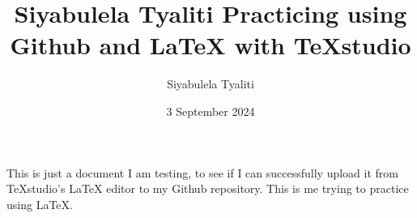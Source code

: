 \documentclass{article}
\begin{document}
 
	
	\date{3 September 2024}  
	
	\author{Siyabulela Tyaliti} 
	
	\title{Siyabulela Tyaliti Practicing using Github and LaTeX with TeXstudio}
	
	\maketitle 

	
	This is just a document I am testing, to see if I can successfully upload it from TeXstudio's LaTeX editor to my Github repository. This is me trying to practice using LaTeX. 
	
\end{document}
